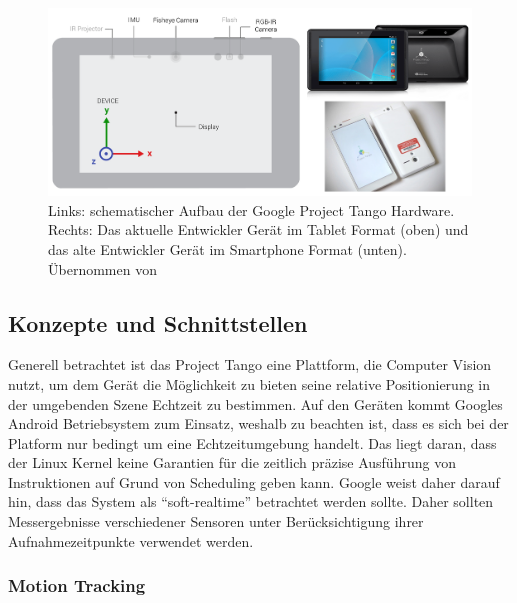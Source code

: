 \begin{figure}[h]
  \centering
	\includegraphics[width=1.0\textwidth]{content/images/theory/tango-device.png} 
  \caption{Links: schematischer Aufbau der Google Project Tango Hardware. Rechts: Das aktuelle Entwickler Gerät im Tablet Format (oben) und das alte Entwickler Gerät im Smartphone Format (unten). Übernommen von \citet{GoogleDevelopers:online}}
  \label{fig:tango-device}
\end{figure}

\subsection{Konzepte und Schnittstellen}

Generell betrachtet ist das Project Tango eine Plattform, die Computer Vision nutzt, um dem Gerät die Möglichkeit zu bieten seine relative Positionierung in der umgebenden Szene Echtzeit zu bestimmen. Auf den Geräten kommt Googles Android Betriebsystem zum Einsatz, weshalb zu beachten ist, dass es sich bei der Platform nur bedingt um eine Echtzeitumgebung handelt. Das liegt daran, dass der Linux Kernel keine Garantien für die zeitlich präzise Ausführung von Instruktionen auf Grund von Scheduling geben kann. Google weist daher darauf hin, dass das System als \enquote{soft-realtime} betrachtet werden sollte. Daher sollten Messergebnisse verschiedener Sensoren unter Berücksichtigung ihrer Aufnahmezeitpunkte verwendet werden. \citep{GoogleDevelopersConcepts:online} 

\subsubsection{Motion Tracking}

